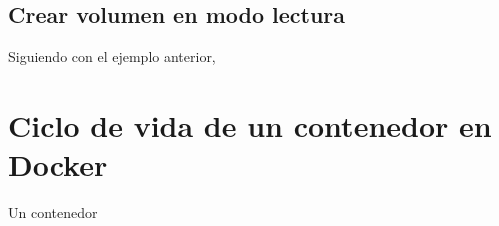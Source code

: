 \subsection{Crear volumen en modo lectura}
Siguiendo con el ejemplo anterior,


\hypertarget{ciclo_de_vida_contenedor}{}
\section{Ciclo de vida de un contenedor en Docker}
Un contenedor



